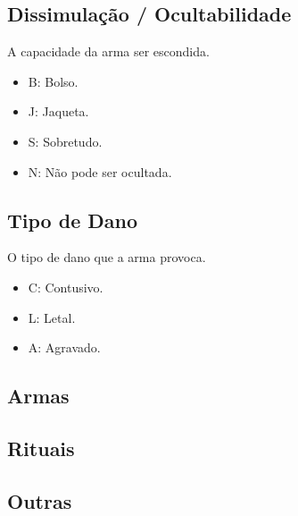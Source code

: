 

\begin{multicols}{2}

\subsection{Dissimulação / Ocultabilidade}
A capacidade da arma ser escondida.
\begin{itemize}[noitemsep]
\item B: Bolso.
\item J: Jaqueta. 
\item S: Sobretudo.
\item N: Não pode ser ocultada.
\end{itemize}

\subsection{Tipo de Dano}
O tipo de dano que a arma provoca.
\begin{itemize}[noitemsep]
\item C: Contusivo.
\item L: Letal. 
\item A: Agravado.
\end{itemize}

\end{multicols}

\subsection{Armas}

\newpage


\newpage


\newpage

\subsection{Rituais}

\newpage

\subsection{Outras}


\newpage
